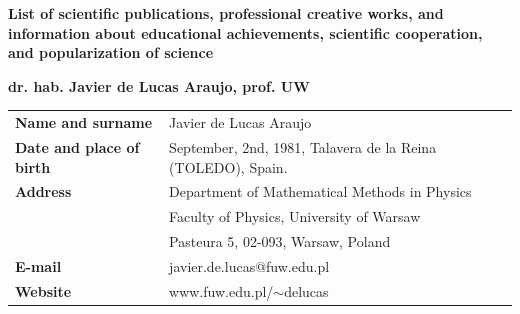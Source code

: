 \documentclass[12pt,reqno]{amsbook}
\begin{document}
\begin{center}
{\large\textbf{List of scientific publications, professional creative works, and information about educational achievements, scientific cooperation, and popularization of science}}
\vspace{0.25cm}

{\large\textbf{ dr. hab. Javier de Lucas Araujo, prof. UW}}
\end{center}
\vskip 0.5cm

{\Large \textbf{ }}
\vspace{1cm}
\begin{tabular}{ll}
        \textbf{Name and surname} & Javier de Lucas Araujo\\
        \textbf{Date and place of birth} & September, 2nd, 1981, Talavera de la Reina (TOLEDO), Spain.\\
        \textbf{Address} &Department of Mathematical Methods in Physics\\& Faculty of Physics, University of Warsaw\\& Pasteura 5, 02-093, Warsaw, Poland\\
        \textbf{E-mail} &javier.de.lucas@fuw.edu.pl\\
        \textbf{Website}& www.fuw.edu.pl/$\sim$delucas
\end{tabular}\\
\vspace{1cm}
\end{document}
